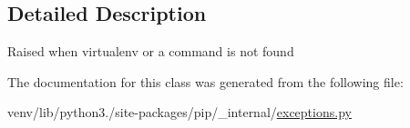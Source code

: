 \subsection{Detailed Description}
\begin{DoxyVerb}Raised when virtualenv or a command is not found\end{DoxyVerb}
 

The documentation for this class was generated from the following file\+:\begin{DoxyCompactItemize}
\item 
venv/lib/python3./site-\/packages/pip/\+\_\+internal/\hyperlink{pip_2__internal_2exceptions_8py}{exceptions.\+py}\end{DoxyCompactItemize}
